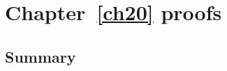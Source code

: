 \chapter{Chapter~\ref{ch20} proofs}

\newpage
\section{Summary}\label{ch20.ps.summary}
\lpscriptsummary
